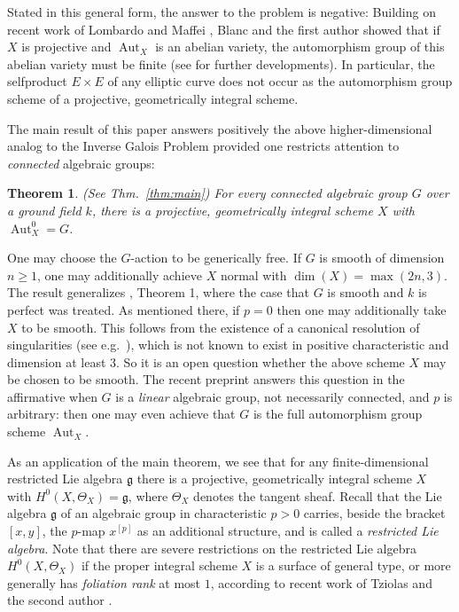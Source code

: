 \documentclass[oneside, 12pt]{amsart}
\newtheorem*{maintheorem}{Theorem}
\theoremstyle{definition}
\theoremstyle{remark}
\newcommand{\Aut}{\operatorname{Aut}}
\newcommand{\lieg}{\mathfrak{g}}
\begin{document}
Stated in this general form,  the answer to the problem is negative: 
Building on recent work of Lombardo and Maffei \cite{Lombardo; Maffei 2020}, 
Blanc and the first author \cite{Blanc; Brion 2021} showed that if $X$ is projective 
and $\Aut_X$ is an abelian variety, the automorphism group of this abelian variety 
must be finite (see \cite{Florence 2021} for further developments).
In particular, the selfproduct $E\times E$ of any elliptic curve  
does not occur as the automorphism group scheme of a projective, 
geometrically integral scheme.
  
The main result of this paper answers positively the above higher-dimensional
analog to the Inverse Galois Problem provided one restricts
attention to \emph{connected} algebraic groups:

\begin{maintheorem}
(See Thm.\ \ref{thm:main})
For every connected algebraic group $G$ over a ground field $k$, 
there is a projective,  geometrically integral scheme $X$ with $ \Aut_X^0= G$.
\end{maintheorem}
 
One may choose the $G$-action to be generically free. If $G$ is smooth 
of dimension $n\geq 1$, one may additionally achieve $X$ normal with 
$\dim(X)=\max(2n,3)$. 
The result generalizes \cite{Brion 2014}, Theorem 1,
where the case that $G$ is smooth and $k$ is perfect was treated.
As mentioned there, if $p = 0$ then one may additionally take $X$
to be smooth. This follows from the existence of a canonical 
resolution of singularities (see  e.g.~\cite{Kollar 2007}), 
which is not known to exist in positive characteristic and 
dimension at least $3$. So it is an open question whether
the above scheme $X$ may be chosen to be smooth. The recent
preprint \cite{Florence 2023} answers this question in the 
affirmative when $G$ is a \emph{linear} algebraic group,
not necessarily connected, and $p$ is arbitrary: 
then one may even achieve that $G$ is the full automorphism 
group scheme $\Aut_X$.

As an application of the main theorem,
we see that for any finite-dimensional restricted Lie algebra $\lieg$ 
there is a projective, geometrically integral scheme $X$ 
with $H^0(X,\Theta_X)=\lieg$, where $\Theta_X$ denotes the tangent sheaf. 
Recall that the Lie algebra $\lieg$ of an algebraic group in characteristic $p>0$
carries, beside the bracket $[x,y]$, the $p$-map $x^{[p]}$ as an additional structure,  and is called a \emph{restricted Lie algebra}.
Note that there are severe restrictions on the restricted Lie algebra
$H^0(X,\Theta_X)$ if the proper integral scheme $X$ is a surface of general type,
or more generally has \emph{foliation rank}  at most $1$, according to recent work
of Tziolas and the second author \cite{Schroeer; Tziolas 2023}.
\end{document}
